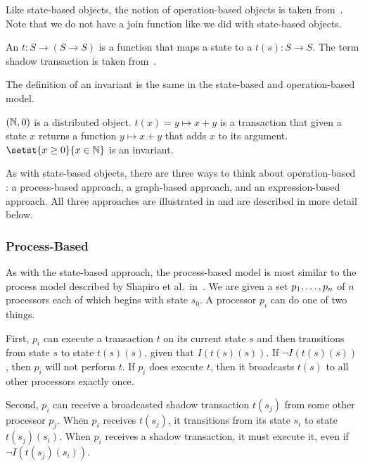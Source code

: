 Like state-based objects, the notion of operation-based objects is taken
from~\cite{shapiro2011conflict}. Note that we do not have a join function like
we did with state-based objects.

\begin{definition}
  An  $t: S \to (S \to S)$ is a function
  that maps a state to a  $t(s): S \to S$. The term
  shadow transaction is taken from~\cite{li2014automating}.
\end{definition}

The definition of an invariant is the same in the state-based and
operation-based model.

\begin{example}
  $(\mathbb{N}, 0)$ is a distributed object. $t(x) = y \mapsto x + y$ is a
  transaction that given a state $x$ returns a function $y \mapsto x + y$ that
  adds $x$ to its argument. $\setst{x \geq 0}{x \in \nats}$ is an invariant.
\end{example}

As with state-based objects, there are three ways to think about
operation-based \Iconfluence{}: a process-based approach, a graph-based
approach, and an expression-based approach. All three approaches are
illustrated in  and are described in more detail below.



\subsubsection{Process-Based}
As with the state-based approach, the process-based model is most similar to
the process model described by Shapiro et al.\ in~\cite{shapiro2011conflict}.
We are given a set ${p}_{1}, \ldots, {p}_{n}$ of $n$ processors each of which begins with
state $s_0$. A processor $p_i$ can do one of two things.

First, $p_i$ can execute a transaction $t$ on its current state $s$ and then
transitions from state $s$ to state $t(s)(s)$, given that $I(t(s)(s))$. If
$\lnot I(t(s)(s))$, then $p_i$ will not perform $t$. If $p_i$ does execute $t$,
then it broadcasts $t(s)$ to all other processors exactly once.

Second, $p_i$ can receive a broadcasted shadow transaction $t(s_j)$ from some
other processor $p_j$. When $p_i$ receives $t(s_j)$, it transitions from its
state $s_i$ to state $t(s_j)(s_i)$. When $p_i$ receives a shadow transaction,
it must execute it, even if $\lnot I(t(s_j)(s_i))$.


